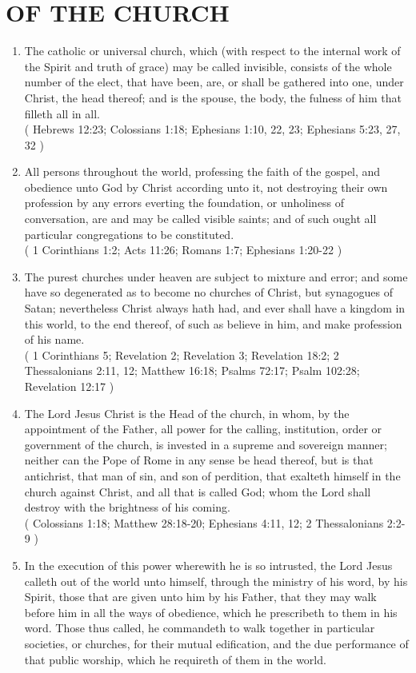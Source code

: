 \documentclass[12pt,a4paper]{book}
\begin{document}
\chapter{OF THE CHURCH}
\label{ch-chu}
\begin{enumerate}
\item
\label{ch-chu-1}
The catholic or universal church, which (with respect to the internal work of the Spirit and truth of grace) may be called invisible, consists of the whole number of the elect, that have been, are, or shall be gathered into one, under Christ, the head thereof; and is the spouse, the body, the fulness of him that filleth all in all.\\
( Hebrews 12:23; Colossians 1:18; Ephesians 1:10, 22, 23; Ephesians 5:23, 27, 32 )
\item
\label{ch-chu-2}
All persons throughout the world, professing the faith of the gospel, and obedience unto God by Christ according unto it, not destroying their own profession by any errors everting the foundation, or unholiness of conversation, are and may be called visible saints; and of such ought all particular congregations to be constituted.\\
( 1 Corinthians 1:2; Acts 11:26; Romans 1:7; Ephesians 1:20-22 )
\item
\label{ch-chu-3}
The purest churches under heaven are subject to mixture and error; and some have so degenerated as to become no churches of Christ, but synagogues of Satan; nevertheless Christ always hath had, and ever shall have a kingdom in this world, to the end thereof, of such as believe in him, and make profession of his name.\\
( 1 Corinthians 5; Revelation 2; Revelation 3; Revelation 18:2; 2 Thessalonians 2:11, 12; Matthew 16:18; Psalms 72:17; Psalm 102:28; Revelation 12:17 )
\item
\label{ch-chu-4}
The Lord Jesus Christ is the Head of the church, in whom, by the appointment of the Father, all power for the calling, institution, order or government of the church, is invested in a supreme and sovereign manner; neither can the Pope of Rome in any sense be head thereof, but is that antichrist, that man of sin, and son of perdition, that exalteth himself in the church against Christ, and all that is called God; whom the Lord shall destroy with the brightness of his coming.\\
( Colossians 1:18; Matthew 28:18-20; Ephesians 4:11, 12; 2 Thessalonians 2:2-9 )
\item
\label{ch-chu-5}
In the execution of this power wherewith he is so intrusted, the Lord Jesus calleth out of the world unto himself, through the ministry of his word, by his Spirit, those that are given unto him by his Father, that they may walk before him in all the ways of obedience, which he prescribeth to them in his word. Those thus called, he commandeth to walk together in particular societies, or churches, for their mutual edification, and the due performance of that public worship, which he requireth of them in the world.\\

\end{enumerate}
\end{document}
